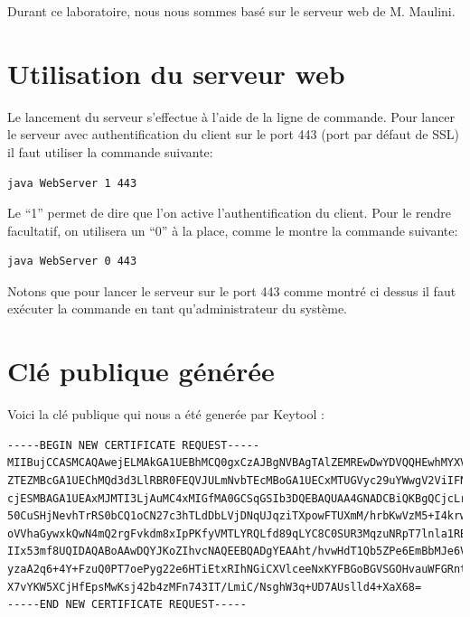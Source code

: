 \documentclass[10pt,a4paper,titlepage]{article}
\begin{document}
Durant ce laboratoire, nous nous sommes basé sur le serveur web de M. Maulini. 

\section{Utilisation du serveur web}

Le lancement du serveur s'effectue à l'aide de la ligne de commande. Pour lancer le serveur avec authentification du client sur le port 443 (port par défaut de SSL) il faut utiliser la commande suivante:

\lstset{frameround=fttt}
\begin{lstlisting}[frame=trBL]
	java WebServer 1 443
\end{lstlisting}

Le “1” permet de dire que l'on active l'authentification du client. Pour le rendre facultatif, on utilisera un “0” à la place, comme le montre la commande suivante:

\begin{lstlisting}[frame=trBL]
	java WebServer 0 443
\end{lstlisting}

Notons que pour lancer le serveur sur le port 443 comme montré ci dessus il faut exécuter la commande en tant qu'administrateur du système. 





\section{Clé publique générée}

Voici la clé publique qui nous a été generée par Keytool :

{\scriptsize
\begin{verbatim}
-----BEGIN NEW CERTIFICATE REQUEST-----
MIIBujCCASMCAQAwejELMAkGA1UEBhMCQ0gxCzAJBgNVBAgTAlZEMREwDwYDVQQHEwhMYXVzYW5u
ZTEZMBcGA1UEChMQd3d3LlRBR0FEQVJULmNvbTEcMBoGA1UECxMTUGVyc29uYWwgV2ViIFNlcnZl
cjESMBAGA1UEAxMJMTI3LjAuMC4xMIGfMA0GCSqGSIb3DQEBAQUAA4GNADCBiQKBgQCjcLrCVl/h
50CuSHjNevhTrRS0bCQ1oCN27c3hTLdDbLVjDNqUJqziTXpowFTUXmM/hrbKwVzM5+I4krwx/6dW
oVVhaGywxkQwN4mQ2rgFvkdm8xIpPKfyVMTLYRQLfd89qLYC8C0SUR3MqzuNRpT7lnla1RB9A6Mg
IIx53mf8UQIDAQABoAAwDQYJKoZIhvcNAQEEBQADgYEAAht/hvwHdT1Qb5ZPe6EmBbMJe6VozqQT
yzaA2q6+4Y+FzuQ0PT7oePyg22e6HTiEtxRIhNGiCXVlceeNxKYFBGoBGVSGOHvauWFGRntErntQ
X7vYKW5XCjHfEpsMwKsj42b4zMFn743IT/LmiC/NsghW3q+UD7AUslld4+XaX68=
-----END NEW CERTIFICATE REQUEST-----
\end{verbatim}
}
\end{document}
